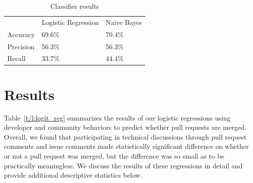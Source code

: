 \documentclass{sigchi}
\begin{document}
\begin{table}[ht] \centering
  \caption{Classifier results}
  \label{tbl:classifiers}
  \begin{tabular}{lll}
  \hline\hline
  ~         & Logistic Regression & Naive Bayes \\
  Accuracy  & 69.6\%              & 70.4\%      \\
  Precision & 56.3\%              & 56.3\%      \\
  Recall    & 33.7\%              & 44.4\%      \\
  \hline
  \end{tabular}
\end{table}

\newpage
\section{Results} \label{chap:results}
Table~\ref{t/l:logit_reg} summarizes the results of our logistic regressions 
using developer and community behaviors to predict whether pull requests are 
merged. Overall, we found that participating in technical discussions through 
pull request comments and issue comments made statistically significant 
difference on whether or not a pull request was merged, but the difference was 
so small as to be practically meaningless. We discuss the results of these 
regressions in detail and provide additional descriptive statistics below.
\end{document}
